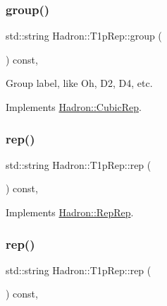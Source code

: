 \subsubsection{\texorpdfstring{group()}{group()}\hspace{0.1cm}{\footnotesize\ttfamily [3/3]}}
{\footnotesize\ttfamily std\+::string Hadron\+::\+T1p\+Rep\+::group (\begin{DoxyParamCaption}{ }\end{DoxyParamCaption}) const\hspace{0.3cm}{\ttfamily [inline]}, {\ttfamily [virtual]}}

Group label, like Oh, D2, D4, etc. 

Implements \mbox{\hyperlink{structHadron_1_1CubicRep_a0748f11ec87f387062c8e8981339a29c}{Hadron\+::\+Cubic\+Rep}}.

\mbox{\label{structHadron_1_1T1pRep_a2cdc4017e6c5a92d190bc873e44361fe}} 
\subsubsection{\texorpdfstring{rep()}{rep()}\hspace{0.1cm}{\footnotesize\ttfamily [1/5]}}
{\footnotesize\ttfamily std\+::string Hadron\+::\+T1p\+Rep\+::rep (\begin{DoxyParamCaption}{ }\end{DoxyParamCaption}) const\hspace{0.3cm}{\ttfamily [inline]}, {\ttfamily [virtual]}}



Implements \mbox{\hyperlink{structHadron_1_1RepRep_ab3213025f6de249f7095892109575fde}{Hadron\+::\+Rep\+Rep}}.

\mbox{\label{structHadron_1_1T1pRep_a2cdc4017e6c5a92d190bc873e44361fe}} 
\subsubsection{\texorpdfstring{rep()}{rep()}\hspace{0.1cm}{\footnotesize\ttfamily [2/5]}}
{\footnotesize\ttfamily std\+::string Hadron\+::\+T1p\+Rep\+::rep (\begin{DoxyParamCaption}{ }\end{DoxyParamCaption}) const\hspace{0.3cm}{\ttfamily [inline]}, {\ttfamily [virtual]}}



